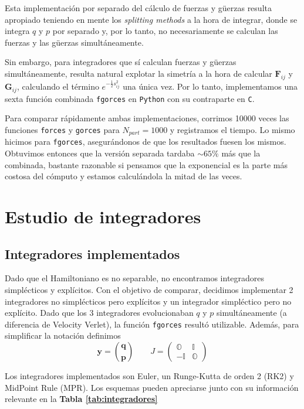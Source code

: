 \documentclass[twoside, 12pt]{article}
\begin{document}
Esta implementación por separado del cálculo de fuerzas y güerzas resulta apropiado teniendo en mente los \textit{splitting methods} a la hora de integrar, donde se integra $q$ y $p$ por separado y, por lo tanto,
no necesariamente se calculan las fuerzas y las güerzas simultáneamente.

Sin embargo, para integradores que sí calculan fuerzas y güerzas simultáneamente, resulta natural explotar la simetría a la hora de calcular $\mathbf{F}_{ij}$ y $\mathbf{G}_{ij}$, calculando el término
$e^{-\frac{1}{2}s_{ij}^2}$ una única vez. Por lo tanto, implementamos una sexta función combinada \texttt{fgorces} en \texttt{Python} con su contraparte en \texttt{C}.

Para comparar rápidamente ambas implementaciones, corrimos 10000 veces las funciones \texttt{forces} y \texttt{gorces} para $N_{part} = 1000$ y registramos el tiempo.
Lo mismo hicimos para \texttt{fgorces}, asegurándonos de que los resultados fuesen los mismos.
Obtuvimos entonces que la versión separada tardaba $\sim 65\%$ más que la combinada, bastante razonable si pensamos que la exponencial es la parte más costosa del cómputo y estamos calculándola la mitad de las veces.

\section{Estudio de integradores}

\subsection{Integradores implementados}

Dado que el Hamiltoniano es no separable, no encontramos integradores simplécticos y explícitos.
Con el objetivo de comparar, decidimos implementar 2 integradores no simplécticos pero explícitos y un integrador simpléctico pero no explícito.
Dado que los 3 integradores evolucionaban $q$ y $p$ simultáneamente (a diferencia de Velocity Verlet), la función \texttt{fgorces} resultó utilizable.
Además, para simplificar la notación definimos \[\mathbf{y} = \binom{\mathbf{q}}{\mathbf{p}} \qquad J = \begin{pmatrix}
\mathbb{O} & \mathbb{I} \\
-\mathbb{I} & \mathbb{O}
\end{pmatrix}
  \]

Los integradores implementados son Euler, un Runge-Kutta de orden 2 (RK2) y MidPoint Rule (MPR).
Los esquemas pueden apreciarse junto con su información relevante en la \textbf{Tabla \ref{tab:integradores}}
\end{document}
